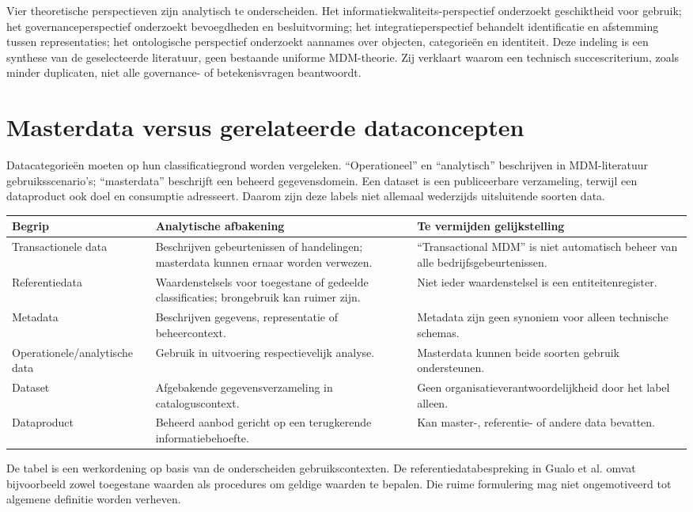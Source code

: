 Vier theoretische perspectieven zijn analytisch te onderscheiden. Het informatiekwaliteits-perspectief onderzoekt geschiktheid voor gebruik; het governanceperspectief onderzoekt bevoegdheden en besluitvorming; het integratieperspectief behandelt identificatie en afstemming tussen representaties; het ontologische perspectief onderzoekt aannames over objecten, categorieën en identiteit. Deze indeling is een synthese van de geselecteerde literatuur, geen bestaande uniforme MDM-theorie. Zij verklaart waarom een technisch succescriterium, zoals minder duplicaten, niet alle governance- of betekenisvragen beantwoordt. \parencite{L15,L07,L21,L08}

\section{Masterdata versus gerelateerde dataconcepten}
Datacategorieën moeten op hun classificatiegrond worden vergeleken. ``Operationeel'' en ``analytisch'' beschrijven in MDM-literatuur gebruiksscenario's; ``masterdata'' beschrijft een beheerd gegevensdomein. Een dataset is een publiceerbare verzameling, terwijl een dataproduct ook doel en consumptie adresseert. Daarom zijn deze labels niet allemaal wederzijds uitsluitende soorten data. \parencite{L20,S47,L12}

\begin{longtable}{@{}P{.19\linewidth}P{.37\linewidth}P{.36\linewidth}@{}}
\toprule Begrip & Analytische afbakening & Te vermijden gelijkstelling \\\midrule
Transactionele data & Beschrijven gebeurtenissen of handelingen; masterdata kunnen ernaar worden verwezen. & ``Transactional MDM'' is niet automatisch beheer van alle bedrijfsgebeurtenissen. \\
Referentiedata & Waardenstelsels voor toegestane of gedeelde classificaties; brongebruik kan ruimer zijn. & Niet ieder waardenstelsel is een entiteitenregister. \\
Metadata & Beschrijven gegevens, representatie of beheercontext. & Metadata zijn geen synoniem voor alleen technische schemas. \\
Operationele/\allowbreak analytische data & Gebruik in uitvoering respectievelijk analyse. & Masterdata kunnen beide soorten gebruik ondersteunen. \\
Dataset & Afgebakende gegevensverzameling in cataloguscontext. & Geen organisatieverantwoordelijkheid door het label alleen. \\
Dataproduct & Beheerd aanbod gericht op een terugkerende informatiebehoefte. & Kan master-, referentie- of andere data bevatten. \\
\bottomrule
\end{longtable}
De tabel is een werkordening op basis van de onderscheiden gebruikscontexten. De referentiedatabespreking in Gualo et al. omvat bijvoorbeeld zowel toegestane waarden als procedures om geldige waarden te bepalen. Die ruime formulering mag niet ongemotiveerd tot algemene definitie worden verheven. \parencite{L19,S08,S47,L12}
